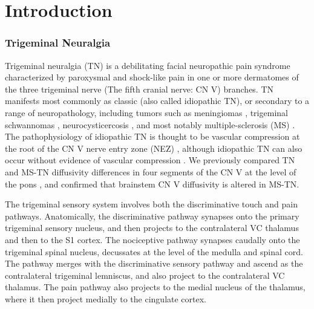 \section{Introduction}
\subsubsection{Trigeminal Neuralgia}
Trigeminal neuralgia (TN) is a debilitating facial neuropathic pain syndrome characterized by paroxysmal and shock-like pain in one or more dermatomes of the three trigeminal nerve (The fifth cranial nerve: CN V) branches. TN manifests most commonly as classic (also called idiopathic TN), or secondary to a range of neuropathology, including tumors such as meningiomas \cite{Cheng2008}, trigeminal schwannomas \cite{Miller2008}, neurocysticercosis \cite{Revuelta1995}, and most notably multiple-sclerosis (MS) \cite{Cruccu2009,VanderMeijs2002,Nick2012}. The pathophysiology of idiopathic TN is thought to be vascular compression at the root of the CN V nerve entry zone (NEZ) \cite{Linn2011,Love2001}, although idiopathic TN can also occur without evidence of vascular compression \cite{Lee2014}. We previously compared TN and MS-TN diffusivity differences in four segments of the CN V at the level of the pons \cite{Chen2016a}, and confirmed that brainstem CN V diffusivity is altered in MS-TN. 

The trigeminal sensory system involves both the discriminative touch and pain pathways. Anatomically, the discriminative pathway synapses onto the primary trigeminal sensory nucleus, and then projects to the contralateral VC thalamus and then to the S1 cortex. The nociceptive pathway synapses caudally onto the trigeminal spinal nucleus, decussates at the level of the medulla and spinal cord. The pathway merges with the discriminative sensory pathway and ascend as the contralateral trigeminal lemniscus, and also project to the contralateral VC thalamus. The pain pathway also projects to the medial nucleus of the thalamus, where it then project medially to the cingulate cortex. 


